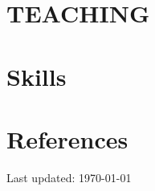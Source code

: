 \documentclass{prometheus_cv}
\begin{document}
\section{TEACHING}


\section{Skills}


\section{References}






\begin{center}
  \begin{footnotesize}
    Last updated: \today \\
  \end{footnotesize}
\end{center}
\end{document}
